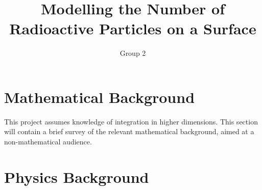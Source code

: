 \documentclass[11pt]{article}
\title{\textbf{Modelling the Number of Radioactive Particles on a Surface}}
\author{Group 2}
\begin{document}
\maketitle

\section{Mathematical Background}
This project assumes knowledge of integration in higher dimensions. This section will contain a brief survey of the relevant mathematical background, aimed at a non-mathematical audience.

\section{Physics Background}
\end{document}
